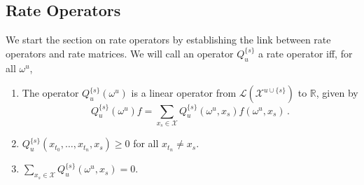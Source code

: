 \documentclass[a4paper,reqno]{amsart}
\newcommand{\states}{\mathcal{X}}
\newcommand{\gambles}{\mathcal{L}}
\newcommand{\norm}[1]{\left\lVert #1 \right\rVert}
\begin{document}

\subsection{Rate Operators}

We start the section on rate operators by establishing the link between rate operators and rate matrices. We will call an operator $Q_u^{\{s\}}$ a rate operator iff, for all $\omega^u$,
\begin{enumerate}
\item The operator $Q_u^{\{s\}}(\omega^u)$ is a linear operator from $\gambles(\states^{u\cup\{s\}})$ to $\mathbb{R}$, given by
\begin{equation*}
Q_u^{\{s\}}(\omega^u)f = \sum_{x_s\in\states} Q_u^{\{s\}}(\omega^u,x_s)f(\omega^u,x_s)\,.
\end{equation*}
\item $Q_u^{\{s\}}(x_{t_0},\ldots,x_{t_n},x_s) \geq 0$ for all $x_{t_n}\neq x_s$.
\item $\sum_{x_s\in\states} Q_u^{\{s\}}(\omega^u,x_s) = 0$.
\end{enumerate}
\end{document}
